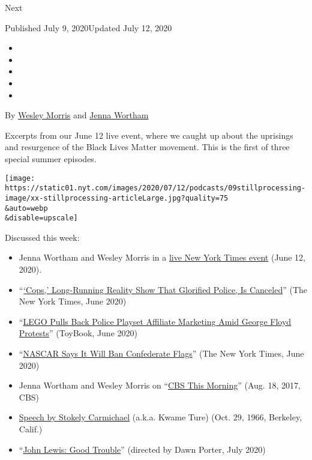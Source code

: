 Next

Published July 9, 2020Updated July 12, 2020

\begin{itemize}
\item
\item
\item
\item
\item
\end{itemize}

By \href{https://www.nytimes.com/by/wesley-morris}{Wesley Morris} and
\href{https://www.nytimes.com/by/jenna-wortham}{Jenna Wortham}

Excerpts from our June 12 live event, where we caught up about the
uprisings and resurgence of the Black Lives Matter movement. This is the
first of three special summer episodes.

\texttt{[image: https://static01.nyt.com/images/2020/07/12/podcasts/09stillprocessing-image/xx-stillprocessing-articleLarge.jpg?quality=75\\\&auto=webp\\\&disable=upscale]}

Discussed this week:

\begin{itemize}
\item
  Jenna Wortham and Wesley Morris in a
  \href{https://timesevents.nytimes.com/stillprocessing0612}{live New
  York Times event} (June 12, 2020).
\item
  ``\href{https://www.nytimes.com/2020/06/09/business/media/cops-canceled-paramount-tv-show.html}{`Cops,'
  Long-Running Reality Show That Glorified Police, Is Canceled}'' (The
  New York Times, June 2020)
\item
  ``\href{https://toybook.com/lego-pulling-back-potentially-sensitive-product-amid-george-floyd-protests/}{LEGO
  Pulls Back Police Playset Affiliate Marketing Amid George Floyd
  Protests}'' (ToyBook, June 2020)
\item
  ``\href{https://www.nytimes.com/2020/06/10/sports/autoracing/nascar-confederate-flags.html}{NASCAR
  Says It Will Ban Confederate Flags}'' (The New York Times, June 2020)
\item
  Jenna Wortham and Wesley Morris on
  ``\href{https://www.youtube.com/watch?v=my1FfSsT5-E}{CBS This
  Morning}'' (Aug. 18, 2017, CBS)
\item
  \href{http://americanradioworks.publicradio.org/features/blackspeech/scarmichael.html}{Speech
  by Stokely Carmichael} (a.k.a. Kwame Ture) (Oct. 29, 1966, Berkeley,
  Calif.)
\item
  ``\href{https://www.youtube.com/watch?v=z_oEkOdIXdo}{John Lewis: Good
  Trouble}'' (directed by Dawn Porter, July 2020)
\end{itemize}

